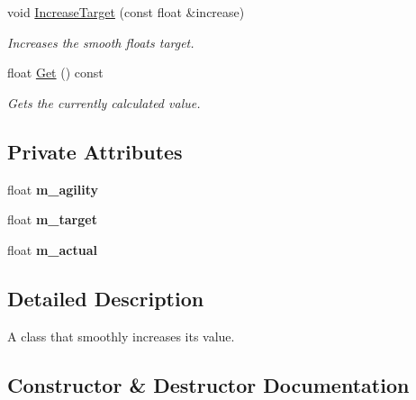 \begin{DoxyCompactItemize}
void \hyperlink{class_flounder_1_1_smooth_float_a55abfe2e8d7092e88e4f224deda12d36}{Increase\+Target} (const float \&increase)
\begin{DoxyCompactList}\small\item\em Increases the smooth floats target. \end{DoxyCompactList}\item 
float \hyperlink{class_flounder_1_1_smooth_float_ad82bddc50cbf59958dcb6e4c9b6b02f2}{Get} () const
\begin{DoxyCompactList}\small\item\em Gets the currently calculated value. \end{DoxyCompactList}\end{DoxyCompactItemize}
\subsection*{Private Attributes}
\begin{DoxyCompactItemize}
\item 
\mbox{\label{class_flounder_1_1_smooth_float_a29739cadf75b5ea782be806459d4243e}} 
float {\bfseries m\+\_\+agility}
\item 
\mbox{\label{class_flounder_1_1_smooth_float_a7e31e1fa4ee544112812ebe416ff4ba4}} 
float {\bfseries m\+\_\+target}
\item 
\mbox{\label{class_flounder_1_1_smooth_float_aa8a6f6e04f8a855567a5871e70cbf486}} 
float {\bfseries m\+\_\+actual}
\end{DoxyCompactItemize}


\subsection{Detailed Description}
A class that smoothly increases its value. 



\subsection{Constructor \& Destructor Documentation}
\mbox{\label{class_flounder_1_1_smooth_float_a84287dcb82c5c78d59421a3b2d6c9ec0}} 
